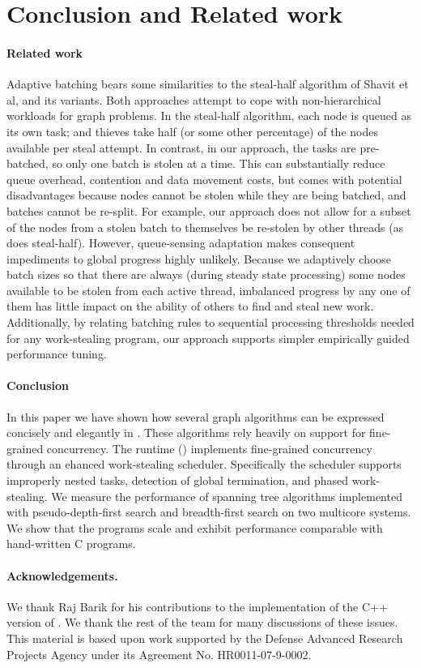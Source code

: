 \section{Conclusion and Related work}\label{sec:concl}
\paragraph{Related work}
Adaptive batching bears some similarities to the steal-half algorithm
of Shavit et al, and its variants. Both approaches attempt to cope
with non-hierarchical workloads for graph problems. In the steal-half
algorithm, each node is queued as its own task; and thieves take half
(or some other percentage) of the nodes available per steal
attempt. In contrast, in our approach, the tasks are pre-batched, so
only one batch is stolen at a time. This can substantially reduce
queue overhead, contention and data movement costs, but comes with
potential disadvantages because nodes cannot be stolen while they are
being batched, and batches cannot be re-split.  For example, our
approach does not allow for a subset of the nodes from a stolen batch
to themselves be re-stolen by other threads (as does
steal-half). However, queue-sensing adaptation makes consequent
impediments to global progress highly unlikely.  Because we adaptively
choose batch sizes so that there are always (during steady state
processing) some nodes available to be stolen from each active thread,
imbalanced progress by any one of them has little impact on the
ability of others to find and steal new work.  Additionally, by
relating batching rules to sequential processing thresholds needed for
any work-stealing program, our approach supports simpler empirically
guided performance tuning.

\paragraph{Conclusion}
In this paper we have shown how several graph algorithms can be
expressed concisely and elegantly in \Xten. These algorithms rely
heavily on support for fine-grained concurrency. The \Xten{} runtime
(\XWS) implements fine-grained concurrency through an ehanced
work-stealing scheduler. Specifically the scheduler supports
improperly nested tasks, detection of global termination, and phased
work-stealing.  We measure the performance of spanning tree algorithms
implemented with pseudo-depth-first search and breadth-first search on
two multicore systems. We show that the \XWS{} programs scale and
exhibit performance comparable with hand-written C programs.

\paragraph{Acknowledgements.} 
We thank Raj Barik for his contributions to the implementation of the
C++ version of \XWS. We thank the rest of the \Xten{} team for many
discussions of these issues. This material is based upon work
supported by the Defense Advanced Research Projects Agency under its
Agreement No.  HR0011-07-9-0002.
